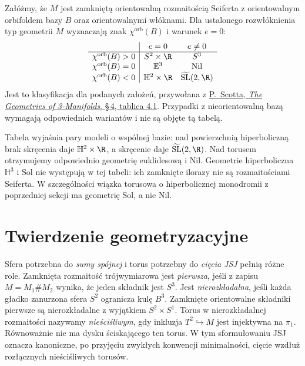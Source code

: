 \begin{twierdzenie}
\label{thm:thurston-seifert-table}
Załóżmy, że $M$ jest zamkniętą orientowalną rozmaitością
Seiferta z orientowalnym orbifoldem bazy $B$ oraz orientowalnymi
włóknami. Dla ustalonego rozwłóknienia typ geometrii $M$
wyznaczają znak $\chi^{\mathrm{orb}}(B)$ i warunek $e=0$:
\[
\begin{array}{c|cc}
 & e=0 & e\ne0\\ \hline
\chi^{\mathrm{orb}}(B)>0 & S^2\times\R & S^3\\
\chi^{\mathrm{orb}}(B)=0 & \mathbb E^3 & \mathrm{Nil}\\
\chi^{\mathrm{orb}}(B)<0 & \mathbb H^2\times\R
 & \widetilde{\mathrm{SL}}(2,\R)
\end{array}
\]
Jest to klasyfikacja dla podanych założeń, przywołana z
\href{https://sschleimer.warwick.ac.uk/Teach/2021_3MFDS/References/1983the_geometries_of_three-manifolds.pdf}
{P.\ Scotta, \emph{The Geometries of 3-Manifolds}, \S\,4,
tablica 4.1}. Przypadki z nieorientowalną bazą wymagają
odpowiednich wariantów i nie są objęte tą tabelą.
\end{twierdzenie}

Tabela wyjaśnia pary modeli o wspólnej bazie: nad powierzchnią
hiperboliczną brak skręcenia daje
$\mathbb H^2\times\R$, a skręcenie daje
$\widetilde{\mathrm{SL}}(2,\R)$. Nad torusem
otrzymujemy odpowiednio geometrię euklidesową i $\mathrm{Nil}$.
Geometrie hiperboliczna $\mathbb H^3$ i $\mathrm{Sol}$
nie występują w tej tabeli: ich zamknięte ilorazy nie są
rozmaitościami Seiferta. W szczególności wiązka torusowa
o hiperbolicznej monodromii z poprzedniej sekcji ma geometrię
$\mathrm{Sol}$, a nie $\mathrm{Nil}$.

\section{Twierdzenie geometryzacyjne}
\label{sec:thurston-theorem}

Sfera potrzebna do \emph{sumy spójnej} i torus potrzebny do
\emph{cięcia JSJ} pełnią różne role. Zamknięta rozmaitość trójwymiarowa
jest \emph{pierwsza}, jeśli z zapisu $M=M_1\#M_2$ wynika,
że jeden składnik jest $S^3$. Jest \emph{nierozkładalna},
jeśli każda gładko zanurzona sfera $S^2$ ogranicza kulę $B^3$.
Zamknięte orientowalne składniki pierwsze są nierozkładalne
z wyjątkiem $S^2\times S^1$. Torus w nierozkładalnej
rozmaitości nazywamy \emph{nieściśliwym}, gdy inkluzja
$T^2\hookrightarrow M$ jest injektywna na $\pi_1$.
Równoważnie nie ma dysku ściskającego ten torus.
W tym sformułowaniu JSJ oznacza kanoniczne, po przyjęciu
zwykłych konwencji minimalności, cięcie wzdłuż rozłącznych
nieściśliwych torusów.

